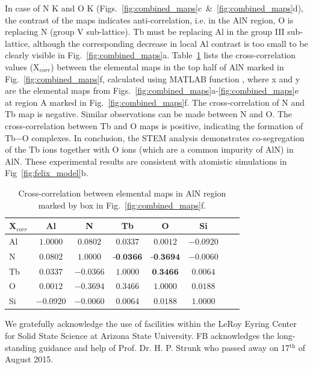 \documentclass[%
aip,
rsi,%
 amsmath,amssymb,%
 reprint,%
]{revtex4-1}
\begin{document}
In case of N K and O K (Figs.~\ref{fig:combined_maps}c~\&~\ref{fig:combined_maps}d), the contrast of the maps indicates anti-correlation, i.e. in the AlN region, O is replacing N (group V sub-lattice). Tb must be replacing Al in the group III sub-lattice, although the corresponding decrease in local Al contrast is too small to be clearly visible in Fig.~\ref{fig:combined_maps}a. Table~\ref{tab:xcorr} lists the cross-correlation values (X$_{corr}$) between the elemental maps in the top half of AlN marked in Fig.~\ref{fig:combined_maps}f, calculated using MATLAB function , where x and y are the elemental maps from Figs.~\ref{fig:combined_maps}a-\ref{fig:combined_maps}e at region A marked in Fig.~\ref{fig:combined_maps}f. The cross-correlation of N and Tb map is negative. Similar observations can be made between N and O. The cross-correlation between Tb and O maps is positive, indicating the formation of Tb$-$O complexes. In conclusion, the STEM analysis demonstrates co-segregation of the Tb ions together with O ions (which are a common impurity of AlN) in AlN. These experimental results are consistent with atomistic simulations in Fig~\ref{fig:felix_model}b.
\begin{table}[h]
	\caption{Cross-correlation between elemental maps in AlN region marked by box in Fig.~\ref{fig:combined_maps}f.}
    \label{tab:xcorr}
    \begin{ruledtabular}
    	\begin{tabular}{lccccccc}
        	X$_{corr}$&Al&N&Tb&O&Si													\\ \hline
            Al& $1.0000$& $0.0802$& $0.0337$& $0.0012$&$-0.0920$					\\
             N& $0.0802$& $1.0000$& $\textbf{-0.0366}$&$\textbf{-0.3694}$&$-0.0060$	\\
            Tb& $0.0337$&$-0.0366$& $1.0000$& $\textbf{0.3466}$&$0.0064$			\\
             O& $0.0012$&$-0.3694$&	$0.3466$& $1.0000$&$0.0188$						\\
            Si&$-0.0920$&$-0.0060$&$0.0064$&$0.0188$& $1.0000$
    	\end{tabular}
    \end{ruledtabular}
\end{table}

\begin{acknowledgments}
We gratefully acknowledge the use of facilities within the LeRoy Eyring Center for Solid State Science at Arizona State University. FB acknowledges the long-standing guidance and help of Prof. Dr. H. P. Strunk who passed away on 17$^\text{th}$ of August 2015.
\end{acknowledgments}

\end{document}
